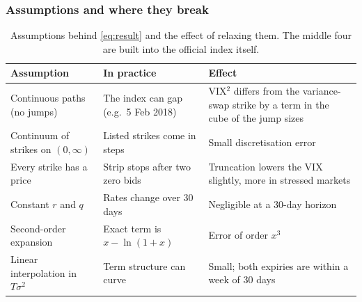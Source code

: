 \subsubsection{Assumptions and where they break}

\begin{table}[H]
\centering
\small
\begin{tabular}{@{}p{3.7cm}p{4.5cm}p{5.4cm}@{}}
\toprule
\textbf{Assumption} & \textbf{In practice} & \textbf{Effect}\\
\midrule
Continuous paths (no jumps) & The index can gap (e.g.\ 5 Feb 2018) & VIX$^2$ differs from the variance-swap strike by a term in the cube of the jump sizes \cite{carrwu}\\
Continuum of strikes on $(0,\infty)$ & Listed strikes come in steps & Small discretisation error\\
Every strike has a price & Strip stops after two zero bids & Truncation lowers the VIX slightly, more in stressed markets\\
Constant $r$ and $q$ & Rates change over 30 days & Negligible at a 30-day horizon\\
Second-order expansion & Exact term is $x-\ln(1+x)$ & Error of order $x^3$\\
Linear interpolation in $T\sigma^2$ & Term structure can curve & Small; both expiries are within a week of 30 days\\
\bottomrule
\end{tabular}
\caption{Assumptions behind \eqref{eq:result} and the effect of relaxing them. The middle four are built into the official index itself.}
\label{tab:assumptions}
\end{table}
